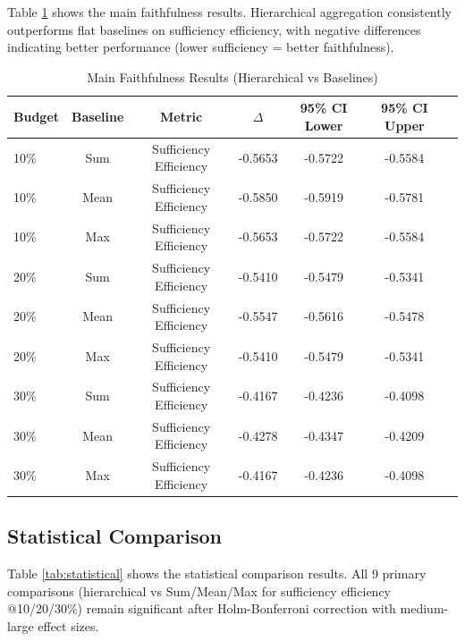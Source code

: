 \documentclass[journal]{IEEEtran}
\begin{document}
Table \ref{tab:faithfulness} shows the main faithfulness results. Hierarchical aggregation consistently outperforms flat baselines on sufficiency efficiency, with negative differences indicating better performance (lower sufficiency = better faithfulness).

\begin{table}[htbp]
\centering
\caption{Main Faithfulness Results (Hierarchical vs Baselines)}
\label{tab:faithfulness}
\begin{tabular}{lcccccc}
\toprule
Budget & Baseline & Metric & $\Delta$ & 95\% CI Lower & 95\% CI Upper \\
\midrule
10\% & Sum & Sufficiency Efficiency & -0.5653 & -0.5722 & -0.5584 \\
10\% & Mean & Sufficiency Efficiency & -0.5850 & -0.5919 & -0.5781 \\
10\% & Max & Sufficiency Efficiency & -0.5653 & -0.5722 & -0.5584 \\
20\% & Sum & Sufficiency Efficiency & -0.5410 & -0.5479 & -0.5341 \\
20\% & Mean & Sufficiency Efficiency & -0.5547 & -0.5616 & -0.5478 \\
20\% & Max & Sufficiency Efficiency & -0.5410 & -0.5479 & -0.5341 \\
30\% & Sum & Sufficiency Efficiency & -0.4167 & -0.4236 & -0.4098 \\
30\% & Mean & Sufficiency Efficiency & -0.4278 & -0.4347 & -0.4209 \\
30\% & Max & Sufficiency Efficiency & -0.4167 & -0.4236 & -0.4098 \\
\bottomrule
\end{tabular}
\end{table}

\subsection{Statistical Comparison}

Table \ref{tab:statistical} shows the statistical comparison results. All 9 primary comparisons (hierarchical vs Sum/Mean/Max for sufficiency efficiency @10/20/30\%) remain significant after Holm-Bonferroni correction with medium-large effect sizes.
\end{document}
